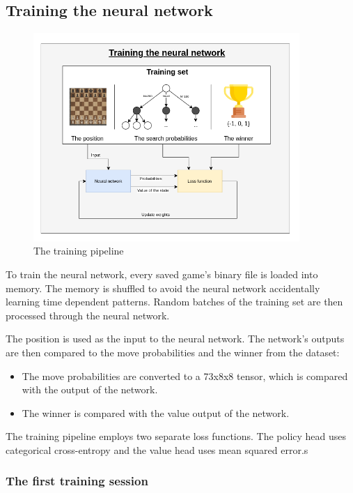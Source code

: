 \documentclass{article}
\begin{document}
\subsection{Training the neural network}

\begin{figure}[H]
    \centering
    \includegraphics[width=0.9\textwidth]{img/training.png}
    \caption{The training pipeline}
\end{figure}

To train the neural network, every saved game's binary file is loaded 
into memory. The memory is shuffled to avoid the neural network accidentally learning
time dependent patterns. Random batches of the training set are then processed through the
neural network.

The position is used as the input to the neural network. The network's outputs are then 
compared to the move probabilities and the winner from the dataset:

\begin{itemize}
    \item The move probabilities are converted to a 73x8x8 tensor, which is compared with the output of the network.
    \item The winner is compared with the value output of the network.
\end{itemize}

The training pipeline employs two separate loss functions. The policy head uses categorical cross-entropy
and the value head uses mean squared error.s

\subsubsection{The first training session}
\end{document}
